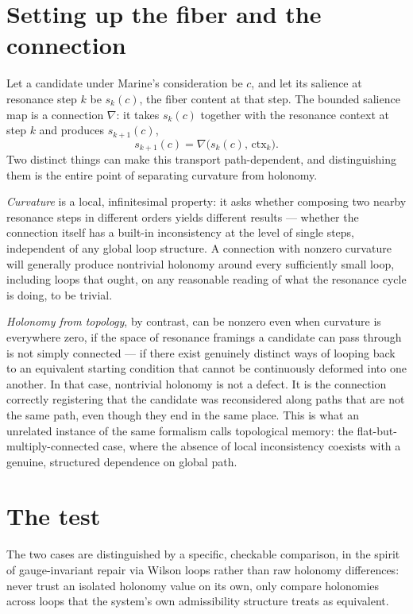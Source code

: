 \documentclass[11pt]{article}
\begin{document}
\section{Setting up the fiber and the connection}

Let a candidate under Marine's consideration be $c$, and let its salience at resonance step $k$ be $s_k(c)$, the fiber content at that step. The bounded salience map is a connection $\nabla$: it takes $s_k(c)$ together with the resonance context at step $k$ and produces $s_{k+1}(c)$,
\[
s_{k+1}(c) = \nabla\big(s_k(c),\, \mathrm{ctx}_k\big).
\]
Two distinct things can make this transport path-dependent, and distinguishing them is the entire point of separating curvature from holonomy.

\emph{Curvature} is a local, infinitesimal property: it asks whether composing two nearby resonance steps in different orders yields different results — whether the connection itself has a built-in inconsistency at the level of single steps, independent of any global loop structure. A connection with nonzero curvature will generally produce nontrivial holonomy around every sufficiently small loop, including loops that ought, on any reasonable reading of what the resonance cycle is doing, to be trivial.

\emph{Holonomy from topology}, by contrast, can be nonzero even when curvature is everywhere zero, if the space of resonance framings a candidate can pass through is not simply connected — if there exist genuinely distinct ways of looping back to an equivalent starting condition that cannot be continuously deformed into one another. In that case, nontrivial holonomy is not a defect. It is the connection correctly registering that the candidate was reconsidered along paths that are not the same path, even though they end in the same place. This is what an unrelated instance of the same formalism calls topological memory: the flat-but-multiply-connected case, where the absence of local inconsistency coexists with a genuine, structured dependence on global path.

\section{The test}

The two cases are distinguished by a specific, checkable comparison, in the spirit of gauge-invariant repair via Wilson loops rather than raw holonomy differences: never trust an isolated holonomy value on its own, only compare holonomies across loops that the system's own admissibility structure treats as equivalent.
\end{document}
